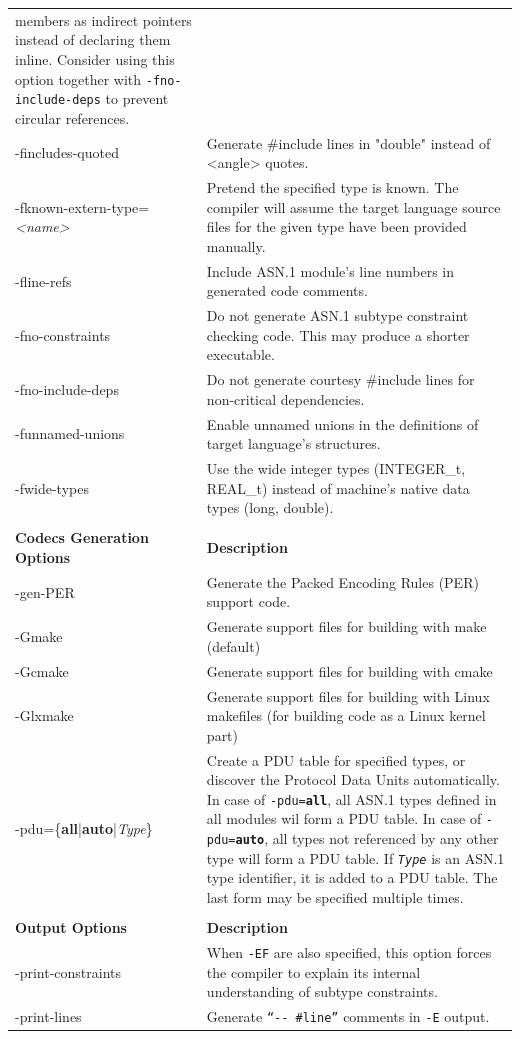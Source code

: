 \documentclass[english,oneside,12pt]{book}
\begin{document}
\begin{longtable}{lp{4in}}
{members as indirect pointers instead of declaring them inline. Consider
using this option together with \texttt{-fno-include-deps}
to prevent circular references.}\\
{\ttfamily -fincludes-quoted} & {\small Generate \#include lines in "double" instead of <angle> quotes.}\\
{\ttfamily -fknown-extern-type=\emph{<name>}} & {\small Pretend the specified type is known. The compiler will assume
the target language source files for the given type have been provided
manually. }\\
{\ttfamily -fline-refs} & {\small Include ASN.1 module's line numbers in generated code comments.}\\
{\ttfamily -fno-constraints} & {\small Do not generate ASN.1 subtype constraint checking code. This
may produce a shorter executable.}\\
{\ttfamily -fno-include-deps} & {\small Do not generate courtesy \#include lines for non-critical dependencies.}\\
{\ttfamily -funnamed-unions} & {\small Enable  unnamed  unions in the definitions of target language's structures.}\\
{\ttfamily -fwide-types} & {\small Use the wide integer types (INTEGER\_t, REAL\_t) instead of machine's native data types (long, double). }\\\\
\textbf{Codecs Generation Options} & \textbf{Description}\\
\midrule
{\ttfamily -gen-PER} & {\small Generate the Packed Encoding Rules (PER) support code.}\\
{\ttfamily -Gmake} & {\small Generate support files for building with make (default)}\\
{\ttfamily -Gcmake} & {\small Generate support files for building with cmake}\\
{\ttfamily -Glxmake} & {\small Generate support files for building with Linux makefiles (for building code as a Linux kernel part)}\\
{\ttfamily -pdu=\{\textbf{all}|\textbf{auto}|\emph{Type}\}} & {\small Create a PDU table for specified types, or discover the Protocol Data Units automatically.
In case of \texttt{-pdu=\textbf{all}}, all ASN.1 types defined in all modules wil form a PDU table. In case of \texttt{-pdu=\textbf{auto}}, all types not referenced by any other type will form a PDU table. If \texttt{\emph{Type}} is an ASN.1 type identifier, it is added to a PDU table. The last form may be specified multiple times.}\\ \\
\textbf{Output Options} & \textbf{Description}\\
\midrule
{\ttfamily -print-constraints} & {\small When \texttt{-EF} are also specified, this option forces the compiler
to explain its internal understanding of subtype constraints.}\\
{\ttfamily -print-lines} & {\small Generate \texttt{``-{}- \#line''} comments
in \texttt{-E} output.}\\
\end{longtable}
\renewcommand{\arraystretch}{1}
\end{document}
